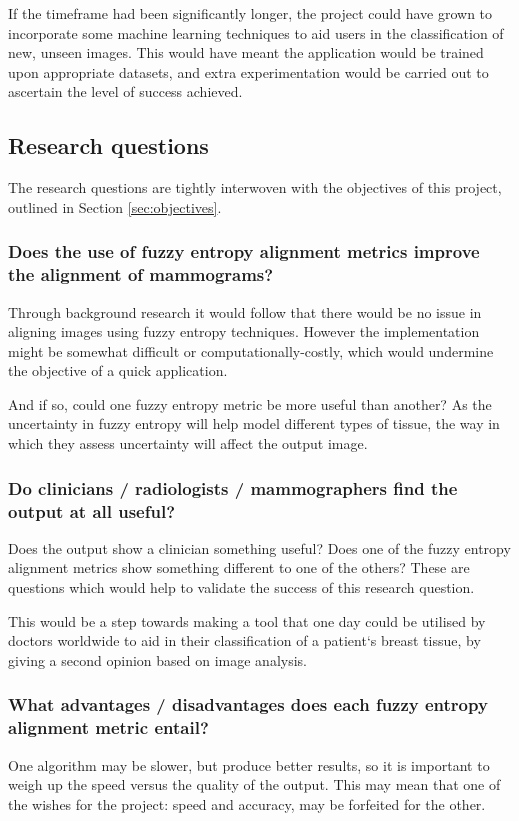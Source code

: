 If the timeframe had been significantly longer, the project could have grown to incorporate some machine learning techniques to aid users in the classification of new, unseen images. This would have meant the application would be trained upon appropriate datasets, and extra experimentation would be carried out to ascertain the level of success achieved.

\newpage
\subsection{Research questions}
\label{ssec:research-qs}

The research questions are tightly interwoven with the objectives of this project, outlined in Section \ref{sec:objectives}.

\subsubsection{Does the use of fuzzy entropy alignment metrics improve the alignment of mammograms?}

Through background research it would follow that there would be no issue in aligning images using fuzzy entropy techniques. However the implementation might be somewhat difficult or computationally-costly, which would undermine the objective of a quick application.

And if so, could one fuzzy entropy metric be more useful than another? As the uncertainty in fuzzy entropy will help model different types of tissue, the way in which they assess uncertainty will affect the output image.

\subsubsection{Do clinicians / radiologists / mammographers find the output at all useful?}

Does the output show a clinician something useful? Does one of the fuzzy entropy alignment metrics show something different to one of the others? These are questions which would help to validate the success of this research question.

This would be a step towards making a tool that one day could be utilised by doctors worldwide to aid in their classification of a patient`s breast tissue, by giving a second opinion based on image analysis.

\subsubsection{What advantages / disadvantages does each fuzzy entropy alignment metric entail?}

One algorithm may be slower, but produce better results, so it is important to weigh up the speed versus the quality of the output. This may mean that one of the wishes for the project: speed and accuracy, may be forfeited for the other.
